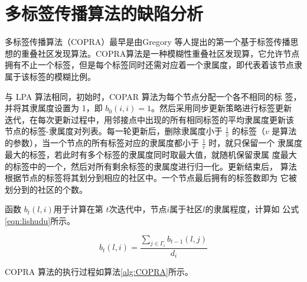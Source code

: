 \section{多标签传播算法的缺陷分析}

多标签传播算法（COPRA）\cite{Gregory2009Finding}最早是由Gregory 等人提出的第一个基于标签传播思想的重叠社区发现算法。COPRA算法是一种模糊性重叠社区发现算，它允许节点拥有不止一个标签，但是每个标签同时还需对应着一个隶属度，即代表着该节点隶属于该标签的模糊比例。

与 LPA 算法相同，初始时，COPAR 算法为每个节点分配一个各不相同的标
签，并将其隶属度设置为 1，即 $b_0(i, i) = 1$。然后采用同步更新策略进行标签更新
迭代，在每次更新过程中，用邻接点中出现的所有相同标签的平均隶属度更新该
节点的标签-隶属度对列表。每一轮更新后，删除隶属度小于 $\frac{1}{v}$ 的标签（$v$ 是算法的参数），当一个节点的所有标签对应的隶属度都小于 $\frac{1}{v}$ 时，就只保留一个
隶属度最大的标签，若此时有多个标签的隶属度同时取最大值，就随机保留隶属
度最大的标签中的一个，然后对所有剩余标签的隶属度进行归一化。更新结束后，
算法根据节点的标签将其划分到相应的社区中。一个节点最后拥有的标签数即为
它被划分到的社区的个数。 

函数 $b_t(l, i)$用于计算在第 $t $次迭代中，节点$ i $属于社区$ l $的隶属程度，计算如
公式\ref{eqn:lishudu}所示。

\begin{equation}
  \label{eqn:lishudu}
  b_t(l,i)=\frac{\sum_{j\in \Gamma_i }b_{t-1}(l,j)}{d_i}
\end{equation}

COPRA 算法的执行过程如算法\ref{alg:COPRA}所示。

